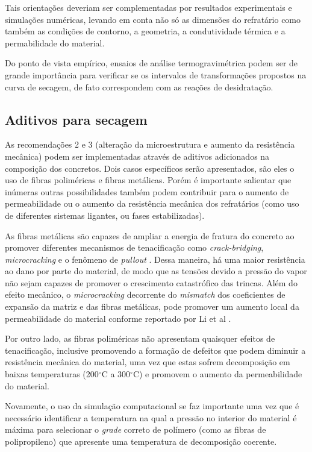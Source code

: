 Tais orientações deveriam ser complementadas por resultados experimentais e
simulações numéricas, levando em conta não só as dimensões do refratário como
também as condições de contorno, a geometria, a condutividade térmica e a
permabilidade do material.

Do ponto de vista empírico, ensaios de análise termogravimétrica podem ser de
grande importância para verificar se os intervalos de transformações propostos
na curva de secagem, de fato correspondem com as reações de desidratação.

\subsection{Aditivos para secagem}
As recomendações 2 e 3 (alteração da microestrutura e aumento da resistência
mecânica) podem ser implementadas através de aditivos adicionados na composição
dos concretos. Dois casos específicos serão apresentados, são eles o uso de
fibras poliméricas e fibras metálicas. Porém é importante salientar que inúmeras
outras possibilidades também podem contribuir para o aumento de permeabilidade
ou o aumento da resistência mecânica dos refratários (como uso de diferentes
sistemas ligantes, ou fases estabilizadas).

As fibras metálicas são capazes de ampliar a energia de fratura do concreto ao
promover diferentes mecanismos de tenacificação como {\it crack-bridging}, {\it
  microcracking} e o fenômeno de {\it pullout} \cite{da2015refractory}. Dessa
maneira, há uma maior resistência ao dano por parte do material, de modo que as
tensões devido a pressão do vapor não sejam capazes de promover o crescimento
catastrófico das trincas. Além do efeito mecânico, o {\it microcracking}
decorrente do {\it mismatch} dos coeficientes de expansão da matriz e das fibras
metálicas, pode promover um aumento local da permeabilidade do material conforme
reportado por Li et al \cite{li2019}.

Por outro lado, as fibras poliméricas não apresentam quaisquer efeitos de
tenacificação, inclusive promovendo a formação de defeitos que podem diminuir a
resistência mecânica do material, uma vez que estas sofrem decomposição em
baixas temperaturas (200$^\circ$C a 300$^\circ$C) e promovem o aumento da
permeabilidade do material.

Novamente, o uso da simulação computacional se faz importante uma vez que é
necessário identificar a temperatura na qual a pressão no interior do material é
máxima para selecionar o {\it grade} correto de polímero (como as fibras de
polipropileno) que apresente uma temperatura de decomposição coerente.

